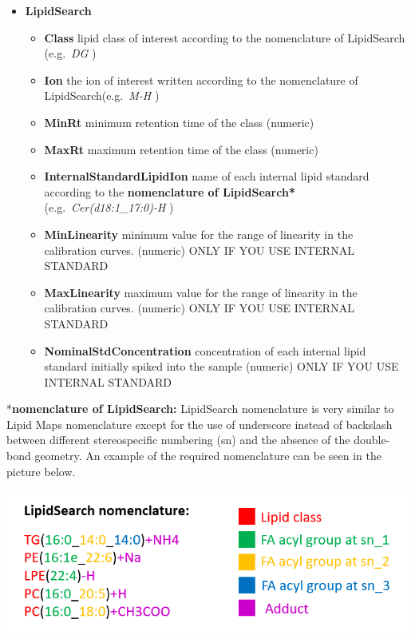 \documentclass[
]{book}
\providecommand{\tightlist}{%
  \setlength{\itemsep}{0pt}\setlength{\parskip}{0pt}}
\begin{document}
\begin{itemize}
\tightlist
\item
  \textbf{LipidSearch}

  \begin{itemize}
  \tightlist
  \item
    \textbf{Class} lipid class of interest according to the nomenclature of LipidSearch (e.g.~\emph{DG} )
  \item
    \textbf{Ion} the ion of interest written according to the nomenclature of LipidSearch(e.g.~\emph{M-H} )
  \item
    \textbf{MinRt} minimum retention time of the class (numeric)
  \item
    \textbf{MaxRt} maximum retention time of the class (numeric)
  \item
    \textbf{InternalStandardLipidIon} name of each internal lipid standard according to the \textbf{nomenclature of LipidSearch*} (e.g.~\emph{Cer(d18:1\_17:0)-H} )
  \item
    \textbf{MinLinearity} minimum value for the range of linearity in the calibration curves. (numeric) ONLY IF YOU USE INTERNAL STANDARD
  \item
    \textbf{MaxLinearity} maximum value for the range of linearity in the calibration curves. (numeric) ONLY IF YOU USE INTERNAL STANDARD
  \item
    \textbf{NominalStdConcentration} concentration of each internal lipid standard initially spiked into the sample (numeric) ONLY IF YOU USE INTERNAL STANDARD
  \end{itemize}
\end{itemize}

*\textbf{nomenclature of LipidSearch:} LipidSearch nomenclature is very similar to Lipid Maps nomenclature except for the use of underscore instead of backslash between different stereospecific numbering (sn) and the absence of the double-bond geometry. An example of the required nomenclature can be seen in the picture below.

\includegraphics[width=1\linewidth]{images/nomenclature}
\end{document}
